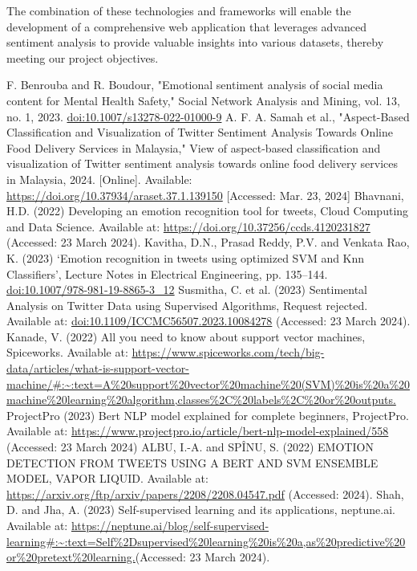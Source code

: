\documentclass[conference]{IEEEtran}
\begin{document}
The combination of these technologies and frameworks will enable the development of a comprehensive web application that leverages advanced sentiment analysis to provide valuable insights into various datasets, thereby meeting our project objectives.
\begin{thebibliography}{00}
 F. Benrouba and R. Boudour, "Emotional sentiment analysis of social media content for Mental Health Safety," Social Network Analysis and Mining, vol. 13, no. 1, 2023. \url{doi:10.1007/s13278-022-01000-9}
 A. F. A. Samah et al., "Aspect-Based Classification and Visualization of Twitter Sentiment Analysis Towards Online Food Delivery Services in Malaysia," View of aspect-based classification and visualization of Twitter sentiment analysis towards online food delivery services in Malaysia, 2024. [Online]. Available: \url{https://doi.org/10.37934/araset.37.1.139150} [Accessed: Mar. 23, 2024]
 Bhavnani, H.D. (2022) Developing an emotion recognition tool for tweets, Cloud Computing and Data Science. Available at: \url{https://doi.org/10.37256/ccds.4120231827} (Accessed: 23 March 2024). 
 Kavitha, D.N., Prasad Reddy, P.V. and Venkata Rao, K. (2023) ‘Emotion recognition in tweets using optimized SVM and Knn Classifiers’, Lecture Notes in Electrical Engineering, pp. 135–144. \url{doi:10.1007/978-981-19-8865-3_12}
Susmitha, C. et al. (2023) Sentimental Analysis on Twitter Data using Supervised Algorithms, Request rejected. Available at: \url{doi:10.1109/ICCMC56507.2023.10084278} (Accessed: 23 March 2024).
 Kanade, V. (2022) All you need to know about support vector machines, Spiceworks. Available at: \url{https://www.spiceworks.com/tech/big-data/articles/what-is-support-vector-machine/#:~:text=A%20support%20vector%20machine%20(SVM)%20is%20a%20machine%20learning%20algorithm,classes%2C%20labels%2C%20or%20outputs.}
 ProjectPro (2023) Bert NLP model explained for complete beginners, ProjectPro. Available at: \url{https://www.projectpro.io/article/bert-nlp-model-explained/558} (Accessed: 23 March 2024)
 ALBU, I.-A. and SPÎNU, S. (2022) EMOTION DETECTION FROM TWEETS USING A BERT AND SVM ENSEMBLE MODEL, VAPOR LIQUID. Available at: \url{https://arxiv.org/ftp/arxiv/papers/2208/2208.04547.pdf} (Accessed: 2024). 
 Shah, D. and Jha, A. (2023) Self-supervised learning and its applications, neptune.ai. Available at: \url{https://neptune.ai/blog/self-supervised-learning#:~:text=Self%2Dsupervised%20learning%20is%20a,as%20predictive%20or%20pretext%20learning.}(Accessed: 23 March 2024). 

\end{thebibliography}
\end{document}
